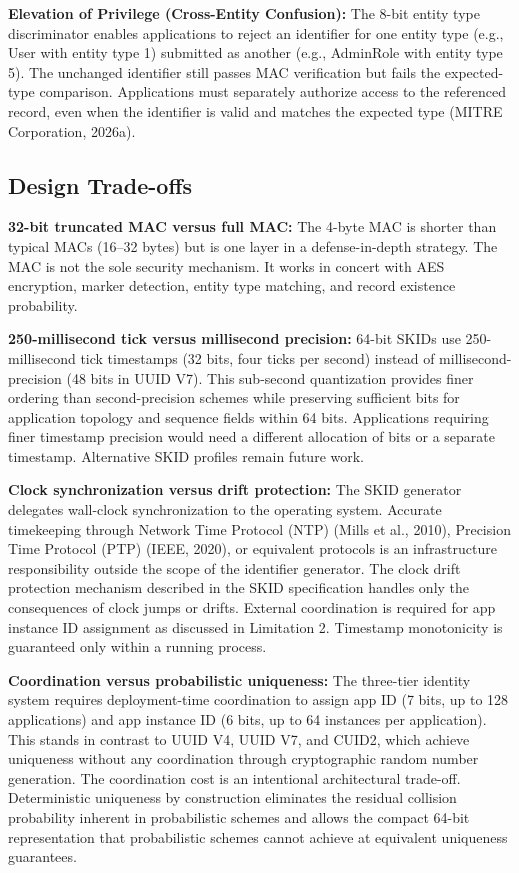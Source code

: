\documentclass[fleqn,10pt]{wlpeerj}
\begin{document}
\textbf{Elevation of Privilege (Cross-Entity Confusion):} The 8-bit
entity type discriminator enables applications to reject an identifier
for one entity type (e.g., User with entity type 1) submitted as another
(e.g., AdminRole with entity type 5). The unchanged identifier still
passes MAC verification but fails the expected-type comparison.
Applications must separately authorize access to the referenced record,
even when the identifier is valid and matches the expected type (MITRE
Corporation, 2026a).

\subsection{Design Trade-offs}\label{design-trade-offs}

\textbf{32-bit truncated MAC versus full MAC:} The 4-byte MAC is shorter
than typical MACs (16--32 bytes) but is one layer in a defense-in-depth
strategy. The MAC is not the sole security mechanism. It works in
concert with AES encryption, marker detection, entity type matching, and
record existence probability.

\textbf{250-millisecond tick versus millisecond precision:} 64-bit SKIDs
use 250-millisecond tick timestamps (32 bits, four ticks per second)
instead of millisecond-precision (48 bits in UUID V7). This sub-second
quantization provides finer ordering than second-precision schemes while
preserving sufficient bits for application topology and sequence fields
within 64 bits. Applications requiring finer timestamp precision would
need a different allocation of bits or a separate timestamp. Alternative
SKID profiles remain future work.

\textbf{Clock synchronization versus drift protection:} The SKID
generator delegates wall-clock synchronization to the operating system.
Accurate timekeeping through Network Time Protocol (NTP) (Mills et al.,
2010), Precision Time Protocol (PTP) (IEEE, 2020), or equivalent
protocols is an infrastructure responsibility outside the scope of the
identifier generator. The clock drift protection mechanism described in
the SKID specification handles only the consequences of clock jumps or
drifts. External coordination is required for app instance ID assignment
as discussed in Limitation 2. Timestamp monotonicity is guaranteed only
within a running process.

\textbf{Coordination versus probabilistic uniqueness:} The three-tier
identity system requires deployment-time coordination to assign app ID
(7 bits, up to 128 applications) and app instance ID (6 bits, up to 64
instances per application). This stands in contrast to UUID V4, UUID V7,
and CUID2, which achieve uniqueness without any coordination through
cryptographic random number generation. The coordination cost is an
intentional architectural trade-off. Deterministic uniqueness by
construction eliminates the residual collision probability inherent in
probabilistic schemes and allows the compact 64-bit representation that
probabilistic schemes cannot achieve at equivalent uniqueness
guarantees.
\end{document}
